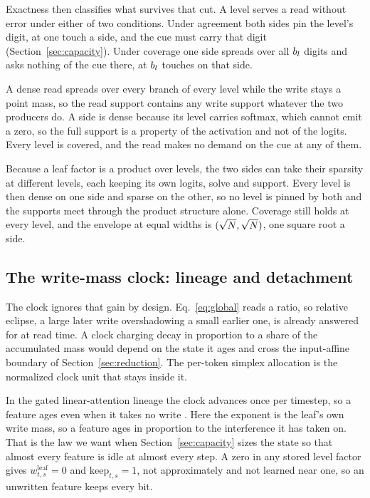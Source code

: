 Exactness then classifies what survives that cut. A level serves a read without error under either of two conditions. Under agreement both sides pin the level's digit, at one touch a side, and the cue must carry that digit (Section~\ref{sec:capacity}). Under coverage one side spreads over all $b_l$ digits and asks nothing of the cue there, at $b_l$ touches on that side.

A dense read spreads over every branch of every level while the write stays a point mass, so the read support contains any write support whatever the two producers do. A side is dense because its level carries softmax, which cannot emit a zero, so the full support is a property of the activation and not of the logits. Every level is covered, and the read makes no demand on the cue at any of them.

Because a leaf factor is a product over levels, the two sides can take their sparsity at different levels, each keeping its own logits, solve and support. Every level is then dense on one side and sparse on the other, so no level is pinned by both and the supports meet through the product structure alone. Coverage still holds at every level, and the envelope at equal widths is $(\sqrt{N}, \sqrt{N})$, one square root a side.

\subsection{The write-mass clock: lineage and detachment}
\label{apd:clock}

The clock ignores that gain by design. Eq.~\eqref{eq:global} reads a ratio, so relative eclipse, a large later write overshadowing a small earlier one, is already answered for at read time. A clock charging decay in proportion to a share of the accumulated mass would depend on the state it ages and cross the input-affine boundary of Section~\ref{sec:reduction}. The per-token simplex allocation is the normalized clock unit that stays inside it.

In the gated linear-attention lineage the clock advances once per timestep, so a feature ages even when it takes no write \citep{yang2024gla, gu2023mamba, yang2024gdn, qin2024hgrn2}. Here the exponent is the leaf's own write mass, so a feature ages in proportion to the interference it has taken on. That is the law we want when Section~\ref{sec:capacity} sizes the state so that almost every feature is idle at almost every step. A zero in any stored level factor gives $w^{\mathrm{leaf}}_{t,s} = 0$ and $\mathrm{keep}_{t,s} = 1$, not approximately and not learned near one, so an unwritten feature keeps every bit.

